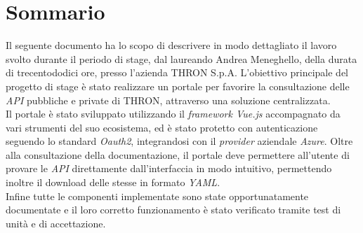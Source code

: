 \cleardoublepage
{}
{}
\begingroup
\let\clearpage\relax
\let\cleardoublepage\relax
\let\cleardoublepage\relax

\chapter*{Sommario}

Il seguente documento ha lo scopo di descrivere in modo dettagliato il lavoro svolto durante il periodo di stage, dal laureando Andrea Meneghello, della durata di trecentododici ore, presso l'azienda THRON S.p.A.
L'obiettivo principale del progetto di stage è stato realizzare un portale per favorire la consultazione delle \textit{API} pubbliche e private di THRON, attraverso una soluzione centralizzata.\\
Il portale è stato sviluppato utilizzando il \textit{framework Vue.js} accompagnato da vari strumenti del suo ecosistema, ed è stato protetto con autenticazione seguendo lo standard \textit{Oauth2}, integrandosi con il \textit{provider} aziendale \textit{Azure}.
Oltre alla consultazione della documentazione, il portale deve permettere all'utente di provare le \textit{API} direttamente dall'interfaccia in modo intuitivo, permettendo inoltre il download delle stesse in formato \textit{YAML}.\\
Infine tutte le componenti implementate sono state opportunatamente documentate e il loro corretto funzionamento è stato verificato tramite test di unità e di accettazione.

\endgroup

\vfill
